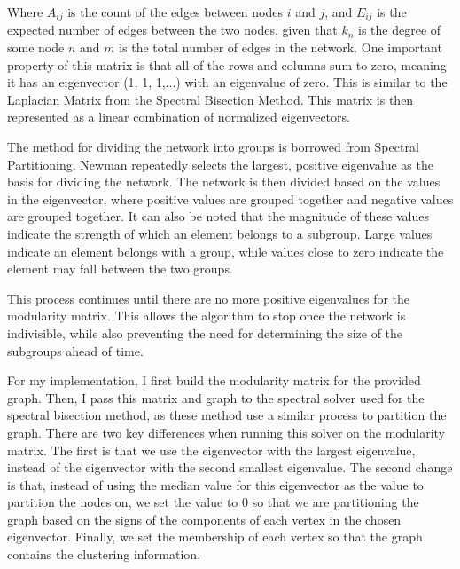 \documentclass{article}
\begin{document}
    Where $A_{ij}$ is the count of the edges between nodes $i$ and $j$, and $E_{ij}$ is the expected number of edges between the two nodes, given that $k_n$ is the degree of some node $n$ and $m$ is the total number of edges in the network. One important property of this matrix is that all of the rows and columns sum to zero, meaning it has an eigenvector (1, 1, 1,...) with an eigenvalue of zero. This is similar to the Laplacian Matrix from the Spectral Bisection Method. This matrix is then represented as a linear combination of normalized eigenvectors.
    \par
    The method for dividing the network into groups is borrowed from Spectral Partitioning. Newman repeatedly selects the largest, positive eigenvalue as the basis for dividing the network. The network is then divided based on the values in the eigenvector, where positive values are grouped together and negative values are grouped together. It can also be noted that the magnitude of these values indicate the strength of which an element belongs to a subgroup. Large values indicate an element belongs with a group, while values close to zero indicate the element may fall between the two groups.
    \par
    This process continues until there are no more positive eigenvalues for the modularity matrix. This allows the algorithm to stop once the network is indivisible, while also preventing the need for determining the size of the subgroups ahead of time.
    \par
    For my implementation, I first build the modularity matrix for the provided graph. Then, I pass this matrix and graph to the spectral solver used for the spectral bisection method, as these method use a similar process to partition the graph. There are two key differences when running this solver on the modularity matrix. The first is that we use the eigenvector with the largest eigenvalue, instead of the eigenvector with the second smallest eigenvalue. The second change is that, instead of using the median value for this eigenvector as the value to partition the nodes on, we set the value to 0 so that we are partitioning the graph based on the signs of the components of each vertex in the chosen eigenvector. Finally, we set the membership of each vertex so that the graph contains the clustering information.
\end{document}
